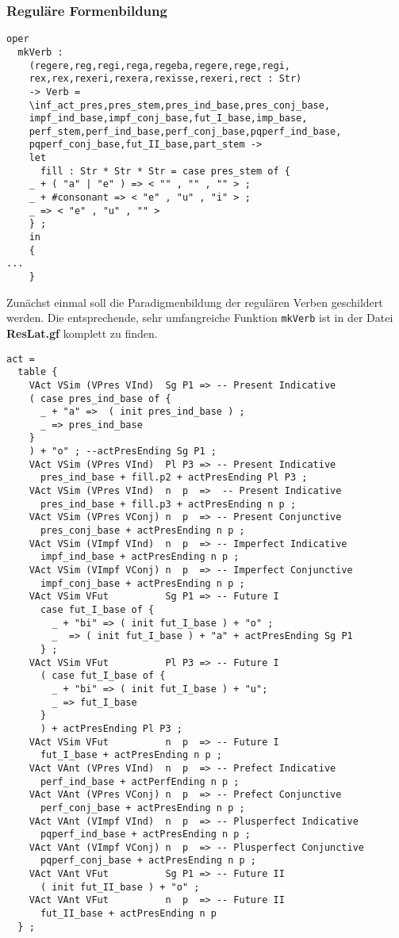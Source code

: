 \subsubsection{Reguläre Formenbildung}
\begin{lstlisting}[float=h!tp,caption={Kopf der Funktion um reguläre Verbformen zu bilden (vgl. \textbf{ResLat.gf})},label={GF-Res-MkVerb},basicstyle=\small]
oper
  mkVerb : 
    (regere,reg,regi,rega,regeba,regere,rege,regi,
    rex,rex,rexeri,rexera,rexisse,rexeri,rect : Str) 
    -> Verb = 
    \inf_act_pres,pres_stem,pres_ind_base,pres_conj_base,
    impf_ind_base,impf_conj_base,fut_I_base,imp_base,
    perf_stem,perf_ind_base,perf_conj_base,pqperf_ind_base,
    pqperf_conj_base,fut_II_base,part_stem -> 
    let
      fill : Str * Str * Str = case pres_stem of {
	_ + ( "a" | "e" ) => < "" , "" , "" > ;
	_ + #consonant => < "e" , "u" , "i" > ;
	_ => < "e" , "u" , "" >
	} ;
    in 
    {
...
    }
\end{lstlisting}
Zunächst einmal soll die Paradigmenbildung der regulären Verben geschildert werden. Die entsprechende, sehr umfangreiche Funktion \texttt{mkVerb} ist in der Datei \textbf{ResLat.gf} komplett zu finden. \par
\begin{lstlisting}[float=h!tp,caption={Ausschnitt aus der Funktion \texttt{mkVerb} um aktive Verbformen zu bilden (vgl. \textbf{ResLat.gf})},label={GF-Res-MkVerb-Act},basicstyle=\small]
act = 
  table {
    VAct VSim (VPres VInd)  Sg P1 => -- Present Indicative
    ( case pres_ind_base of {
      _ + "a" =>  ( init pres_ind_base ) ;
      _ => pres_ind_base
    }
    ) + "o" ; --actPresEnding Sg P1 ;
    VAct VSim (VPres VInd)  Pl P3 => -- Present Indicative
      pres_ind_base + fill.p2 + actPresEnding Pl P3 ;
    VAct VSim (VPres VInd)  n  p  =>  -- Present Indicative
      pres_ind_base + fill.p3 + actPresEnding n p ;
    VAct VSim (VPres VConj) n  p  => -- Present Conjunctive
      pres_conj_base + actPresEnding n p ; 
    VAct VSim (VImpf VInd)  n  p  => -- Imperfect Indicative
      impf_ind_base + actPresEnding n p ; 
    VAct VSim (VImpf VConj) n  p  => -- Imperfect Conjunctive
      impf_conj_base + actPresEnding n p ; 
    VAct VSim VFut          Sg P1 => -- Future I
      case fut_I_base of {
        _ + "bi" => ( init fut_I_base ) + "o" ;
        _  => ( init fut_I_base ) + "a" + actPresEnding Sg P1 
      } ;
    VAct VSim VFut          Pl P3 => -- Future I
      ( case fut_I_base of {
        _ + "bi" => ( init fut_I_base ) + "u";
        _ => fut_I_base
      } 
      ) + actPresEnding Pl P3 ;
    VAct VSim VFut          n  p  => -- Future I
      fut_I_base + actPresEnding n p ; 
    VAct VAnt (VPres VInd)  n  p  => -- Prefect Indicative
      perf_ind_base + actPerfEnding n p ; 
    VAct VAnt (VPres VConj) n  p  => -- Prefect Conjunctive
      perf_conj_base + actPresEnding n p ; 
    VAct VAnt (VImpf VInd)  n  p  => -- Plusperfect Indicative
      pqperf_ind_base + actPresEnding n p ; 
    VAct VAnt (VImpf VConj) n  p  => -- Plusperfect Conjunctive
      pqperf_conj_base + actPresEnding n p ; 
    VAct VAnt VFut          Sg P1 => -- Future II 
      ( init fut_II_base ) + "o" ; 
    VAct VAnt VFut          n  p  => -- Future II 
      fut_II_base + actPresEnding n p 
  } ;
\end{lstlisting}

